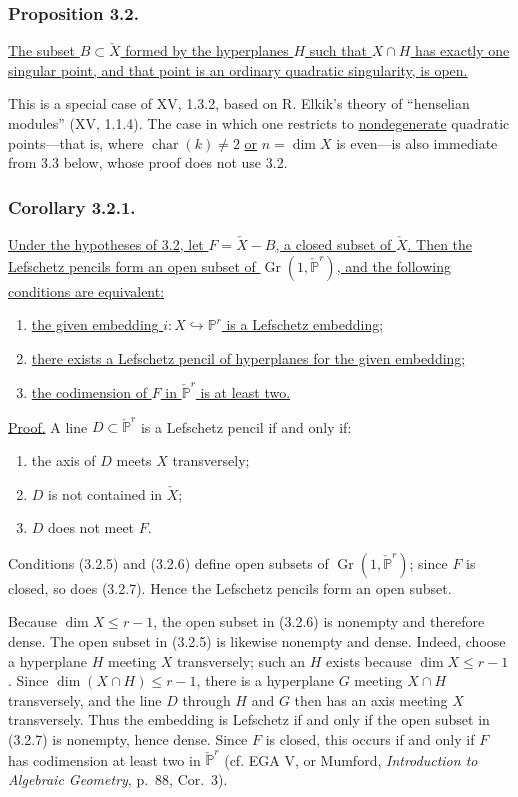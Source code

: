 \subsubsection*{Proposition 3.2.}
\underline{The subset $B\subset\check X$ formed by the hyperplanes
$H$ such that $X\cap H$ has exactly one singular point, and that point
is an ordinary quadratic singularity, is open.}

This is a special case of XV, 1.3.2, based on R. Elkik's theory of
``henselian modules'' (XV, 1.1.4).  The case in which one restricts to
\underline{nondegenerate} quadratic points---that is, where
$\operatorname{char}(k)\ne2$ \underline{or} $n=\dim X$ is even---is
also immediate from 3.3 below, whose proof does not use 3.2.

\subsubsection*{Corollary 3.2.1.}
\underline{Under the hypotheses of 3.2, let $F=\check X-B$, a closed
subset of $\check X$.  Then the Lefschetz pencils form an open subset
of $\operatorname{Gr}(1,\check{\mathbb P}^{r})$, and the following
conditions are equivalent:}
\begin{enumerate}
\item[3.2.2.] \underline{the given embedding
$i:X\hookrightarrow\mathbb P^r$ is a Lefschetz embedding;}
\item[3.2.3.] \underline{there exists a Lefschetz pencil of
hyperplanes for the given embedding;}
\item[3.2.4.] \underline{the codimension of $F$ in
$\check{\mathbb P}^{r}$ is at least two.}
\end{enumerate}

\noindent\underline{Proof.}
A line $D\subset\check{\mathbb P}^{r}$ is a Lefschetz pencil if and
only if:
\begin{enumerate}
\item[(3.2.5)] the axis of $D$ meets $X$ transversely;
\item[(3.2.6)] $D$ is not contained in $\check X$;
\item[(3.2.7)] $D$ does not meet $F$.
\end{enumerate}
Conditions (3.2.5) and (3.2.6) define open subsets of
$\operatorname{Gr}(1,\check{\mathbb P}^{r})$; since $F$ is closed, so
does (3.2.7).  Hence the Lefschetz pencils form an open subset.

Because $\dim X\leq r-1$, the open subset in (3.2.6) is nonempty and
therefore dense.  The open subset in (3.2.5) is likewise nonempty and
dense.  Indeed, choose a hyperplane $H$ meeting $X$ transversely; such
an $H$ exists because $\dim X\leq r-1$.  Since
$\dim(X\cap H)\leq r-1$, there is a hyperplane $G$ meeting
$X\cap H$ transversely, and the line $D$ through $H$ and $G$ then has
an axis meeting $X$ transversely.  Thus the embedding is Lefschetz if
and only if the open subset in (3.2.7) is nonempty, hence dense.  Since
$F$ is closed, this occurs if and only if $F$ has codimension at least
two in $\check{\mathbb P}^{r}$ (cf. EGA V, or Mumford,
\emph{Introduction to Algebraic Geometry}, p.~88, Cor.~3).

